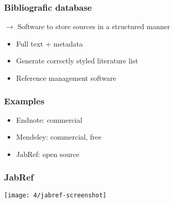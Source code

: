 \documentclass[aspectratio=169]{beamer}
\begin{document}
\begin{frame}
  \frametitle{Bibliografic database}

$\rightarrow$ Software to store sources in a structured manner
  \begin{itemize}
    \item Full text + metadata
    \item Generate correctly styled literature list
    \item Reference management software
  \end{itemize}
\end{frame}

\begin{frame}
  \frametitle{Examples}

  \begin{itemize}
    \item Endnote: commercial
    \item Mendeley: commercial, free
    \item JabRef: open source
  \end{itemize}

\end{frame}

\begin{frame}[plain]
  \frametitle{JabRef}

  \centering
  \texttt{[image: 4/jabref-screenshot]}

\end{frame}
\end{document}
